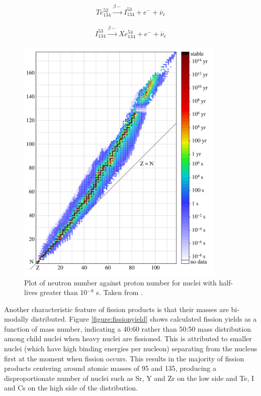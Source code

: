 \begin{equation}
Te_{134}^{52} \xrightarrow[]{\beta-} I_{134}^{53}+ e^{-} + \overline{\nu}_{e}
\label{eqn:te_decay}
\end{equation}

\begin{equation}
I_{134}^{53} \xrightarrow[]{\beta-} Xe_{134}^{54} + e^{-} + \overline{\nu}_{e}
\label{eqn:i_decay}
\end{equation}

\begin{figure}[htp]
\centering
\includegraphics[height=12cm]{images/Isotopes_and_half-life.png}
\caption[Plot of neutron number against proton number for nuclei with half-lives greater than 10${^{-8}}$ s.]{Plot of neutron number against proton number for nuclei with half-lives greater than 10${^{-8}}$ s. Taken from \cite{BenRG}.}
\label{figure:NZcurve}
\end{figure}

Another characteristic feature of fission products is that their masses are bi-modally distributed. Figure \ref{figure:fissionyield} shows calculated fission yields as a function of mass number, indicating a 40:60 rather than 50:50 mass distribution among child nuclei when heavy nuclei are fissioned. This is attributed to smaller nuclei (which have high binding energies per nucleon) separating from the nucleus first at the moment when fission occurs. This results in the majority of fission products centering around atomic masses of 95 and 135, producing a disproportionate number of nuclei such as Sr, Y and Zr on the low side and Te, I and Cs on the high side of the distribution. 


